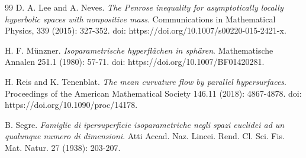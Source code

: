 \documentclass[11pt,a4paper,reqno]{amsproc}
\numberwithin{equation}{section}
\begin{document}
\begin{thebibliography}{99}
 D. A. Lee and A. Neves. {\it {The Penrose inequality
for asymptotically locally hyperbolic spaces with nonpositive mass}}.
Communications in Mathematical Physics, 339 (2015): 327-352. doi:
https://doi.org/10.1007/s00220-015-2421-x.


 H. F. M\"unzner. {\it{Isoparametrische hyperflächen in
sphären}}. Mathematische Annalen 251.1 (1980): 57-71. doi:
https://doi.org/10.1007/BF01420281.

 H. Reis and K. Tenenblat. {\it{The mean curvature flow by
parallel hypersurfaces}}. Proceedings of the American Mathematical Society
146.11 (2018): 4867-4878. doi: https://doi.org/10.1090/proc/14178.

 B. Segre. {\it {Famiglie di ipersuperficie isoparametriche
negli spazi euclidei ad un qualunque numero di dimensioni}}. Atti Accad.
Naz. Lincei. Rend. Cl. Sci. Fis. Mat. Natur. 27 (1938): 203-207.

\end{thebibliography}
\end{document}
